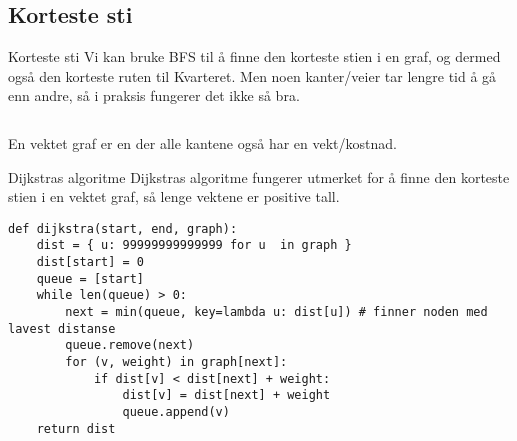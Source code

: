 \subsection{Korteste sti}
\begin{frame}[fragile]{Korteste sti}
    Vi kan bruke BFS til å finne den korteste stien i en graf, og dermed også den korteste ruten til Kvarteret. Men noen kanter/veier tar lengre tid å gå enn andre, så i praksis fungerer det ikke så bra.
    \begin{columns}
        \begin{column}{0.48\textwidth}
        \end{column}
        \pause
        \begin{column}{0.48\textwidth}
        \end{column}
    \end{columns}
    \pause
    \begin{definition}
        En vektet graf er en der alle kantene også har en vekt/kostnad.
    \end{definition}
\end{frame}

\begin{frame}[fragile]{Dijkstras algoritme}
    Dijkstras algoritme fungerer utmerket for å finne den korteste stien i en vektet graf, så lenge vektene er positive tall.
    \begin{verbatim}
def dijkstra(start, end, graph):
    dist = { u: 99999999999999 for u  in graph }
    dist[start] = 0
    queue = [start]
    while len(queue) > 0:
        next = min(queue, key=lambda u: dist[u]) # finner noden med lavest distanse
        queue.remove(next)
        for (v, weight) in graph[next]:
            if dist[v] < dist[next] + weight:
                dist[v] = dist[next] + weight
                queue.append(v)
    return dist
    \end{verbatim}
\end{frame}